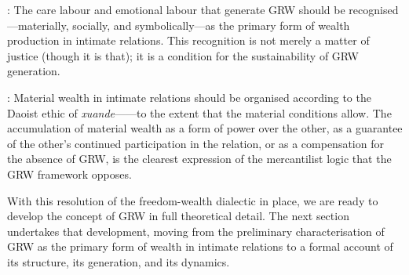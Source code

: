 : The care labour and emotional labour that generate GRW should be recognised---materially, socially, and symbolically---as the primary form of wealth production in intimate relations. This recognition is not merely a matter of justice (though it is that); it is a condition for the sustainability of GRW generation.

: Material wealth in intimate relations should be organised according to the Daoist ethic of \emph{xuande}------to the extent that the material conditions allow. The accumulation of material wealth as a form of power over the other, as a guarantee of the other's continued participation in the relation, or as a compensation for the absence of GRW, is the clearest expression of the mercantilist logic that the GRW framework opposes.

With this resolution of the freedom-wealth dialectic in place, we are ready to develop the concept of GRW in full theoretical detail. The next section undertakes that development, moving from the preliminary characterisation of GRW as the primary form of wealth in intimate relations to a formal account of its structure, its generation, and its dynamics.
